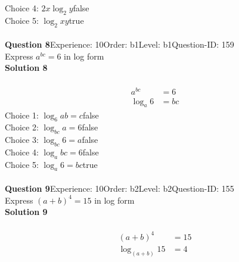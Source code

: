 \documentclass{article}
\begin{document}
Choice 4: \hspace{20pt}$2x\log_{2}y$\hspace{20pt}false\\
Choice 5: \hspace{20pt}$\log_{2}xy$\hspace{20pt}true\\
\\[4pt]
\noindent\textbf{Question 8}\hspace{20pt}Experience: 10\hspace{20pt}Order: b1\hspace{20pt}Level: b1\hspace{20pt}Question-ID: 159\\[2pt]
Express $a^{bc}=6$ in log form\\[4pt]
\noindent\textbf{Solution 8}\\[2pt]
\\[-35pt]\begin{align*}
a^{bc}&=6\\[2pt]
\log_{a}6&=bc
\end{align*}
Choice 1: \hspace{20pt}$\log_{6}ab=c$\hspace{20pt}false\\
Choice 2: \hspace{20pt}$\log_{bc}a=6$\hspace{20pt}false\\
Choice 3: \hspace{20pt}$\log_{bc}6=a$\hspace{20pt}false\\
Choice 4: \hspace{20pt}$\log_{a}bc=6$\hspace{20pt}false\\
Choice 5: \hspace{20pt}$\log_{a}6=bc$\hspace{20pt}true\\
\\[4pt]
\noindent\textbf{Question 9}\hspace{20pt}Experience: 10\hspace{20pt}Order: b2\hspace{20pt}Level: b2\hspace{20pt}Question-ID: 155\\[2pt]
Express $(a+b)^4=15$ in log form\\[4pt]
\noindent\textbf{Solution 9}\\[2pt]
\\[-35pt]\begin{align*}
(a+b)^4&=15\\[2pt]
\log_{(a+b)}15&=4
\end{align*}
\end{document}
